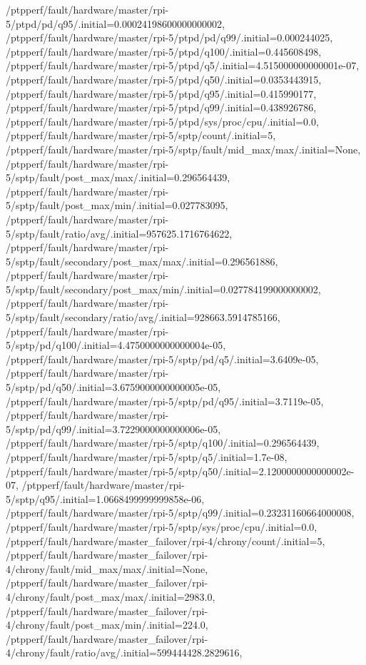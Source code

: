 {    /ptpperf/fault/hardware/master/rpi-5/ptpd/pd/q95/.initial=0.00024198600000000002,
    /ptpperf/fault/hardware/master/rpi-5/ptpd/pd/q99/.initial=0.000244025,
    /ptpperf/fault/hardware/master/rpi-5/ptpd/q100/.initial=0.445608498,
    /ptpperf/fault/hardware/master/rpi-5/ptpd/q5/.initial=4.515000000000001e-07,
    /ptpperf/fault/hardware/master/rpi-5/ptpd/q50/.initial=0.0353443915,
    /ptpperf/fault/hardware/master/rpi-5/ptpd/q95/.initial=0.415990177,
    /ptpperf/fault/hardware/master/rpi-5/ptpd/q99/.initial=0.438926786,
    /ptpperf/fault/hardware/master/rpi-5/ptpd/sys/proc/cpu/.initial=0.0,
    /ptpperf/fault/hardware/master/rpi-5/sptp/count/.initial=5,
    /ptpperf/fault/hardware/master/rpi-5/sptp/fault/mid_max/max/.initial=None,
    /ptpperf/fault/hardware/master/rpi-5/sptp/fault/post_max/max/.initial=0.296564439,
    /ptpperf/fault/hardware/master/rpi-5/sptp/fault/post_max/min/.initial=0.027783095,
    /ptpperf/fault/hardware/master/rpi-5/sptp/fault/ratio/avg/.initial=957625.1716764622,
    /ptpperf/fault/hardware/master/rpi-5/sptp/fault/secondary/post_max/max/.initial=0.296561886,
    /ptpperf/fault/hardware/master/rpi-5/sptp/fault/secondary/post_max/min/.initial=0.027784199000000002,
    /ptpperf/fault/hardware/master/rpi-5/sptp/fault/secondary/ratio/avg/.initial=928663.5914785166,
    /ptpperf/fault/hardware/master/rpi-5/sptp/pd/q100/.initial=4.4750000000000004e-05,
    /ptpperf/fault/hardware/master/rpi-5/sptp/pd/q5/.initial=3.6409e-05,
    /ptpperf/fault/hardware/master/rpi-5/sptp/pd/q50/.initial=3.6759000000000005e-05,
    /ptpperf/fault/hardware/master/rpi-5/sptp/pd/q95/.initial=3.7119e-05,
    /ptpperf/fault/hardware/master/rpi-5/sptp/pd/q99/.initial=3.7229000000000006e-05,
    /ptpperf/fault/hardware/master/rpi-5/sptp/q100/.initial=0.296564439,
    /ptpperf/fault/hardware/master/rpi-5/sptp/q5/.initial=1.7e-08,
    /ptpperf/fault/hardware/master/rpi-5/sptp/q50/.initial=2.1200000000000002e-07,
    /ptpperf/fault/hardware/master/rpi-5/sptp/q95/.initial=1.0668499999999858e-06,
    /ptpperf/fault/hardware/master/rpi-5/sptp/q99/.initial=0.23231160664000008,
    /ptpperf/fault/hardware/master/rpi-5/sptp/sys/proc/cpu/.initial=0.0,
    /ptpperf/fault/hardware/master_failover/rpi-4/chrony/count/.initial=5,
    /ptpperf/fault/hardware/master_failover/rpi-4/chrony/fault/mid_max/max/.initial=None,
    /ptpperf/fault/hardware/master_failover/rpi-4/chrony/fault/post_max/max/.initial=2983.0,
    /ptpperf/fault/hardware/master_failover/rpi-4/chrony/fault/post_max/min/.initial=224.0,
    /ptpperf/fault/hardware/master_failover/rpi-4/chrony/fault/ratio/avg/.initial=599444428.2829616,
}
